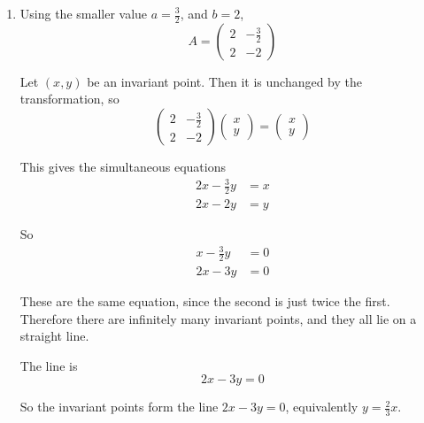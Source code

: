 \documentclass[leqno]{article}
\begin{document}
\begin{enumerate}[
  label=\textbf{\arabic*.},
  leftmargin=*,
  topsep=0pt,
  partopsep=0pt,
  parsep=0pt
]
\begin{tcolorbox}[colback=white, colframe=scarlet, title={\textbf{Solution}}, breakable, grow to left by=6mm, grow to right by=10mm]
\begin{enumerate}[label=\textbf{(\alph*)}]
Hence
\[
b=2,\qquad a=\frac32 \text{ or } 2
\]

  \item Using the smaller value \(a=\frac32\), and \(b=2\),
\[
A=\begin{pmatrix} 2 & -\frac32 \\ 2 & -2 \end{pmatrix}
\]

Let \((x,y)\) be an invariant point. Then it is unchanged by the transformation, so
\[
\begin{pmatrix} 2 & -\frac32 \\ 2 & -2 \end{pmatrix}
\begin{pmatrix} x \\ y \end{pmatrix}
=
\begin{pmatrix} x \\ y \end{pmatrix}
\]

This gives the simultaneous equations
\begin{align*}
2x-\frac32 y&=x\\
2x-2y&=y
\end{align*}

So
\begin{align*}
x-\frac32 y&=0\\
2x-3y&=0
\end{align*}

These are the same equation, since the second is just twice the first. Therefore there are infinitely many invariant points, and they all lie on a straight line.

The line is
\[
2x-3y=0
\]

So the invariant points form the line \(2x-3y=0\), equivalently \(y=\frac{2}{3}x\).
\end{enumerate}
\end{tcolorbox}


\end{enumerate}
\end{document}
